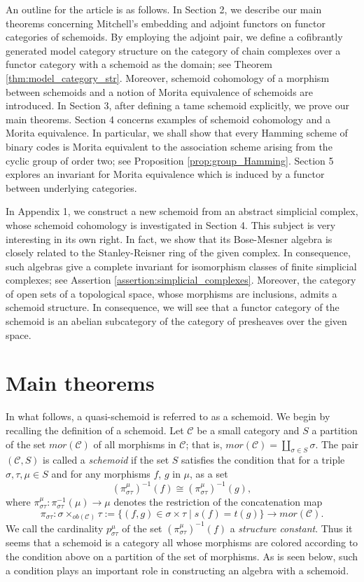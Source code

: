 \documentclass{amsart}
\theoremstyle{definition}
\theoremstyle{remark}
\newcommand{\C}{{\mathcal C}}
\begin{document}
An outline for the article is as follows. In Section 2, 
we describe our main theorems concerning Mitchell's embedding and   
adjoint functors on functor categories of schemoids. By employing the adjoint pair, we define 
a cofibrantly generated model category structure on the category of chain complexes over a functor category 
with a schemoid as the domain; see Theorem \ref{thm:model_category_str}. 
Moreover, schemoid cohomology of a morphism between 
schemoids and a notion of Morita equivalence of schemoids are introduced. 
In Section 3, after defining a tame schemoid explicitly, 
we prove our main theorems. 
Section 4 concerns examples of schemoid cohomology and a Morita equivalence. 
In particular, we shall show that every Hamming scheme of binary codes is Morita equivalent to the association scheme 
arising from the cyclic group of order two; see Proposition \ref{prop:group_Hamming}. 
Section 5 explores an invariant for Morita equivalence which is induced by a functor between underlying categories. 

In Appendix 1, we construct a new schemoid from an abstract simplicial complex, 
whose schemoid cohomology is investigated in Section 4.  
This subject is very interesting in its own right. In fact, we show that its Bose-Mesner algebra is closely related 
to the Stanley-Reisner ring of the given complex. In consequence, such algebras give a complete invariant 
for isomorphism classes of finite simplicial complexes; see Assertion \ref{assertion:simplicial_complexes}.  
Moreover, the category of open sets of a topological space, whose morphisms are inclusions, admits a schemoid structure. In 
consequence, we will see that a functor category of the schemoid is an abelian subcategory of the category of presheaves over the 
given space. 

\section{Main theorems}

In what follows, a quasi-schemoid \cite{K-M} is referred to as a schemoid. 
We begin by recalling the definition of a schemoid. 
Let $\C$ be a small category 
and  $S$ a partition of the set $mor(\C)$ of all morphisms in $\C$; that is, $mor(\C) =\coprod_{\sigma \in S}\sigma$.
The pair $(\C, S)$ is called a {\it schemoid} 
if the set $S$ satisfies the condition that for a triple $\sigma, \tau, \mu \in S$ 
and for any morphisms $f$, $g$ in $\mu$, as a set 
$$
(\pi_{\sigma\tau}^\mu)^{-1}(f) \cong (\pi_{\sigma\tau}^\mu)^{-1}(g), 
$$ 
where $\pi_{\sigma\tau}^\mu : \pi_{\sigma\tau}^{-1}(\mu) \to \mu$ denotes 
the restriction of the concatenation map 
$$\pi_{\sigma\tau} : \sigma \times_{ob(\C)}\tau:=\{(f, g) \in \sigma \times \tau \mid s(f) = t(g)\} \to mor(\C).$$
We call the cardinality $p_{\sigma\tau}^\mu$  of the set $(\pi_{\sigma\tau}^\mu)^{-1}(f)$ a {\it structure constant}. 
Thus it seems that a schemoid is a category all whose morphisms are colored according to the condition above 
on a partition of the set of morphisms. 
As is seen below,  such a condition plays an important role in constructing an algebra with a schemoid.    
\end{document}
